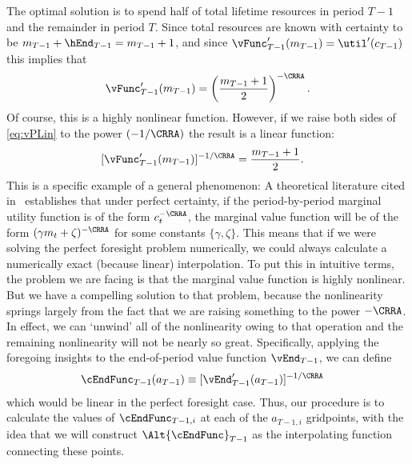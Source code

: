 \documentclass[titlepage]{\econtex}
\begin{document}
The optimal solution is to spend half of total lifetime resources in
period $T-1$ and the remainder in period $T$.  Since total resources
are known with certainty to be
${m}_{T-1}+\hEnd_{T-1}= {m}_{T-1}+1$, and since
${\vFunc}_{T-1}^{\prime}({m}_{T-1}) = \util^{\prime}({c}_{T-1})$ this
implies that 
\begin{equation}
  \vFunc^{\prime}_{T-1}({m}_{T-1})  = \left(\frac{{m}_{T-1}+1}{2}\right)^{-\CRRA} \label{eq:vPLin}.
\end{equation}
Of course, this is a highly nonlinear
function.  However, if we raise both sides of \eqref{eq:vPLin} to the
power $(-1/\CRRA)$ the result is a linear function:
\begin{equation}\begin{gathered}\begin{aligned}
  [\vFunc^{\prime}_{T-1}({m}_{T-1})]^{-1/\CRRA}  & = \frac{{m}_{T-1}+1}{2}  .
\end{aligned}\end{gathered}\end{equation}
This is a specific example of a general phenomenon: A theoretical
literature cited in~\cite{carroll&kimball:concavity} establishes that under
perfect certainty, if the period-by-period marginal utility function
is of the form ${c}_{t}^{-\CRRA}$, the marginal value function will be
of the form $(\gamma {m}_{t}+\zeta)^{-\CRRA}$ for some constants
$\{\gamma,\zeta\}$.  This means that if we were solving the perfect
foresight problem numerically, we could always calculate a numerically
exact (because linear) interpolation.  To put this in intuitive terms,
the problem we are facing is that the marginal value function is
highly nonlinear.  But we have a compelling solution to that problem,
because the nonlinearity springs largely from the fact that we are raising
something to the power $-\CRRA$.  In effect, we can `unwind' all of
the nonlinearity owing to that operation and the remaining
nonlinearity will not be nearly so great.  Specifically, applying the foregoing insights
to the end-of-period value function $\vEnd_{T-1}$, we can define
\begin{equation}\begin{gathered}\begin{aligned}
  \cEndFunc_{T-1}({a}_{T-1})  & \equiv  [\vEnd_{T-1}^{\prime}({a}_{T-1})]^{-1/\CRRA} \label{eq:cGoth}
\end{aligned}\end{gathered}\end{equation}
which would be linear in the perfect foresight case.  Thus, our
procedure is to calculate the values of $\cEndFunc_{T-1,i}$ at each
of the ${a}_{T-1,i}$ gridpoints, with the idea that we will construct
$\Alt{\cEndFunc}_{T-1}$ as the interpolating function connecting
these
points.  %
\end{document}
